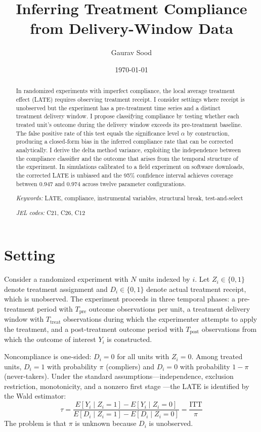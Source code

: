 \documentclass[12pt]{article}
\title{Inferring Treatment Compliance from Delivery-Window Data}
\author{Gaurav Sood}
\date{\today}
\begin{document}
\maketitle

\begin{abstract}
\noindent In randomized experiments with imperfect compliance, the local average treatment effect (LATE) requires observing treatment receipt. I consider settings where receipt is unobserved but the experiment has a pre-treatment time series and a distinct treatment delivery window. I propose classifying compliance by testing whether each treated unit's outcome during the delivery window exceeds its pre-treatment baseline. The false positive rate of this test equals the significance level $\alpha$ by construction, producing a closed-form bias in the inferred compliance rate that can be corrected analytically. I derive the delta method variance, exploiting the independence between the compliance classifier and the outcome that arises from the temporal structure of the experiment. In simulations calibrated to a field experiment on software downloads, the corrected LATE is unbiased and the 95\% confidence interval achieves coverage between 0.947 and 0.974 across twelve parameter configurations.

\medskip
\noindent \textit{Keywords:} LATE, compliance, instrumental variables, structural break, test-and-select

\medskip
\noindent \textit{JEL codes:} C21, C26, C12
\end{abstract}

\section{Setting}

Consider a randomized experiment with $N$ units indexed by $i$. Let $Z_i \in \{0,1\}$ denote treatment assignment and $D_i \in \{0,1\}$ denote actual treatment receipt, which is unobserved. The experiment proceeds in three temporal phases: a pre-treatment period with $T_{\text{pre}}$ outcome observations per unit, a treatment delivery window with $T_{\text{treat}}$ observations during which the experimenter attempts to apply the treatment, and a post-treatment outcome period with $T_{\text{post}}$ observations from which the outcome of interest $Y_i$ is constructed.

Noncompliance is one-sided: $D_i = 0$ for all units with $Z_i = 0$. Among treated units, $D_i = 1$ with probability $\pi$ (compliers) and $D_i = 0$ with probability $1 - \pi$ (never-takers). Under the standard assumptions---independence, exclusion restriction, monotonicity, and a nonzero first stage \citep{imbens1994, angrist1996}---the LATE is identified by the Wald estimator:
\begin{equation}
\tau = \frac{E[Y_i \mid Z_i = 1] - E[Y_i \mid Z_i = 0]}{E[D_i \mid Z_i = 1] - E[D_i \mid Z_i = 0]} = \frac{\text{ITT}}{\pi}
\end{equation}
The problem is that $\pi$ is unknown because $D_i$ is unobserved.
\end{document}
